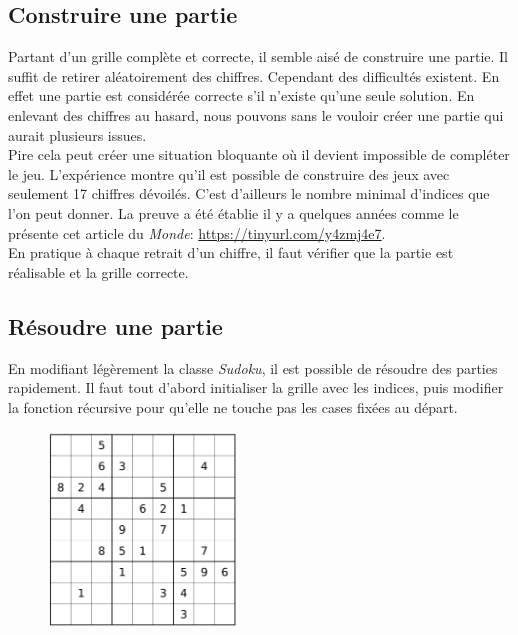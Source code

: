 \documentclass[a4paper,11pt]{article}
\begin{document}
\begin{Form}
\subsection{Construire une partie}
Partant d'un grille complète et correcte, il semble aisé de construire une partie. Il suffit de retirer aléatoirement des chiffres. Cependant des difficultés existent. En effet une partie est considérée correcte s'il n'existe qu'une seule solution. En enlevant des chiffres au hasard, nous pouvons sans le vouloir créer une partie qui aurait plusieurs issues.\\
Pire cela peut créer une situation bloquante où il devient impossible de compléter le jeu. L'expérience montre qu'il est possible de construire des jeux avec seulement 17 chiffres dévoilés. C'est d'ailleurs le nombre minimal d'indices que l'on peut donner. La preuve a été établie il y a quelques années comme le présente cet article du \emph{Monde}: \url{https://tinyurl.com/y4zmj4e7}.\\
En pratique à chaque retrait d'un chiffre, il faut vérifier que la partie est réalisable et la grille correcte.
\subsection{Résoudre une partie}
En modifiant légèrement la classe \emph{Sudoku}, il est possible de résoudre des parties rapidement. Il faut tout d'abord initialiser la grille avec les indices, puis modifier la fonction récursive pour qu'elle ne touche pas les cases fixées au départ.
\begin{figure}[!h]
\centering
\includegraphics[width=5cm]{ressources/partie.png}
\label{partie}
\end{figure}
\end{Form}
\end{document}
